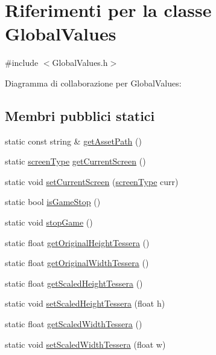 \hypertarget{class_global_values}{}\section{Riferimenti per la classe Global\+Values}
\label{class_global_values}


{\ttfamily \#include $<$Global\+Values.\+h$>$}



Diagramma di collaborazione per Global\+Values\+:
\subsection*{Membri pubblici statici}
\begin{DoxyCompactItemize}
\item 
static const string \& \hyperlink{class_global_values_a379ea0cf2c47f7644b9ee70b314dc8c0}{get\+Asset\+Path} ()
\item 
static \hyperlink{_global_values_8h_a3b1182ff6470e054f713d9ba1d0f9b55}{screen\+Type} \hyperlink{class_global_values_a3ea604dc1f21655d57ad9486c60cbf7d}{get\+Current\+Screen} ()
\item 
static void \hyperlink{class_global_values_aacaacec79d40506c4455b1e927e8146e}{set\+Current\+Screen} (\hyperlink{_global_values_8h_a3b1182ff6470e054f713d9ba1d0f9b55}{screen\+Type} curr)
\item 
static bool \hyperlink{class_global_values_a9fc6ec73e59accab5200eea5f90d5b95}{is\+Game\+Stop} ()
\item 
static void \hyperlink{class_global_values_aef6c1bb1b8314d3c0a24cf3195fdf79a}{stop\+Game} ()
\item 
static float \hyperlink{class_global_values_a703b253eb6956a732cc64631f2dc5acc}{get\+Original\+Height\+Tessera} ()
\item 
static float \hyperlink{class_global_values_a242d902ba619752615765915971f5b9b}{get\+Original\+Width\+Tessera} ()
\item 
static float \hyperlink{class_global_values_a001c2405391f076998692061beb77832}{get\+Scaled\+Height\+Tessera} ()
\item 
static void \hyperlink{class_global_values_a5417a2abd39cda920f81e583f6139afc}{set\+Scaled\+Height\+Tessera} (float h)
\item 
static float \hyperlink{class_global_values_aff5d20cb6c6ffd44dd802f3807f4770e}{get\+Scaled\+Width\+Tessera} ()
\item 
static void \hyperlink{class_global_values_a9f26a8f6a0c74814950c77ab658994a2}{set\+Scaled\+Width\+Tessera} (float w)

\end{DoxyCompactItemize}
